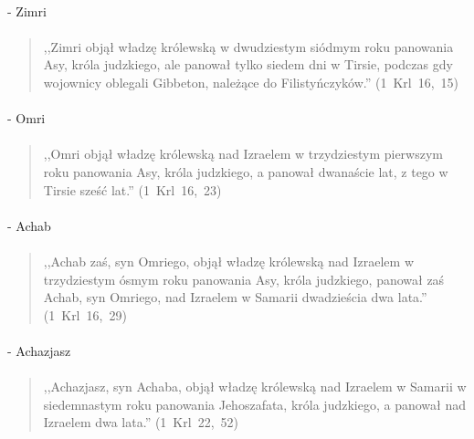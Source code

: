 \documentclass[10pt,a4paper,oneside]{article}
\begin{document}
\paragraph{}
- Zimri
\paragraph{}
\begin{quote}
,,Zimri objął władzę królewską w dwudziestym siódmym roku panowania Asy, króla judzkiego, ale panował tylko siedem dni w Tirsie, podczas gdy wojownicy oblegali Gibbeton, należące do Filistyńczyków.'' \mbox{(1 Krl 16, 15)}
\end{quote}
\paragraph{}
- Omri
\paragraph{}
\begin{quote}
,,Omri objął władzę królewską nad Izraelem w trzydziestym pierwszym roku panowania Asy, króla judzkiego, a panował dwanaście lat, z tego w Tirsie sześć lat.'' \mbox{(1 Krl 16, 23)}
\end{quote}
\paragraph{}
- Achab
\paragraph{}
\begin{quote}
,,Achab zaś, syn Omriego, objął władzę królewską nad Izraelem w trzydziestym ósmym roku panowania Asy, króla judzkiego, panował zaś Achab, syn Omriego, nad Izraelem w Samarii dwadzieścia dwa lata.'' \mbox{(1 Krl 16, 29)}
\end{quote}
\paragraph{}
- Achazjasz
\paragraph{}
\begin{quote}
,,Achazjasz, syn Achaba, objął władzę królewską nad Izraelem w Samarii w siedemnastym roku panowania Jehoszafata, króla judzkiego, a panował nad Izraelem dwa lata.'' \mbox{(1 Krl 22, 52)}
\end{quote}
\end{document}
